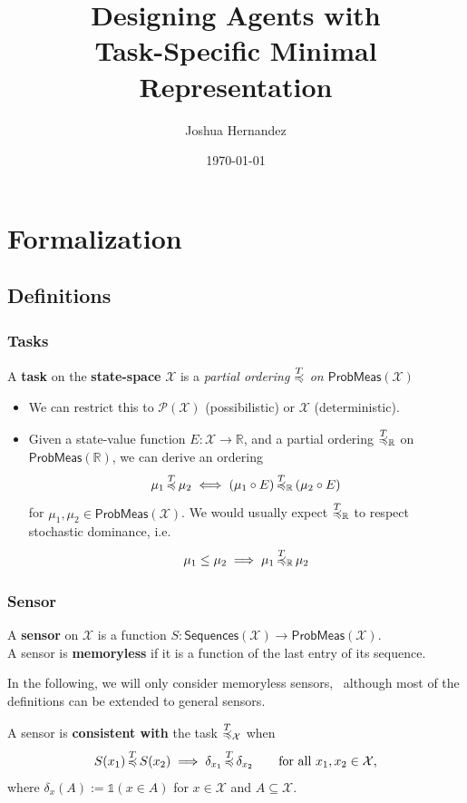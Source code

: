\documentclass{beamer}
\title[Minimal Representation]{Designing Agents with\\ Task-Specific Minimal Representation} %
\author{Joshua Hernandez} %
\institute[UCLA] %
{
University of California, Los Angeles\\ %
\medskip
\textit{jheez@ucla.edu} %
}
\date{\today} %
\def\prob{\mathsf{ProbMeas}}
\def\seq{\mathsf{Sequences}}
\def\X{\mathcal{X}}
\def\RR{\mathbb{R}}
\def\power{\mathcal{P}}
\def\less#1{\overset{#1}{\rule{0pt}{4pt}\smash{\preccurlyeq}}}
\def\subs{\subseteq}
\begin{document}
\begin{frame}
\titlepage %
\end{frame}


\iffalse
\section{Formalization} %

\subsection{Definitions} %


\begin{frame}
\frametitle{Tasks}
\begin{definition}[Task]
A \textbf{task} on the \textbf{state-space} $\X$ is a \emph{partial ordering $\less{T}$ on $\prob(\X)$}
\end{definition}

\begin{itemize}
 \item We can restrict this to $\power(\X)$ (possibilistic) or $\X$ (deterministic).
 \item Given a state-value function $E:\X\to\RR$, and a partial ordering 
 $\less{T}_\RR$ on $\prob(\RR)$, we can derive an ordering
 $$\mu_1\,\less{T}\, \mu_2 \iff (\mu_1\circ E)\,\less{T}_\RR\,(\mu_2\circ E) $$
 for $\mu_1, \mu_2\in\prob(\X)$.  
 We would usually expect $\less{T}_\RR$ to respect stochastic dominance, i.e.
 $$\mu_1\leq\mu_2\implies\mu_1\,\less{T}_\RR\,\mu_2$$
\end{itemize}
\end{frame}




\begin{frame}
\frametitle{Sensor}
\begin{definition}[Sensor]
A \textbf{sensor} on $\X$ is a function $S:\seq(\X)\to\prob(\X)$.\\
A sensor is \textbf{memoryless} if it is a function of the last entry of its sequence.
\end{definition}
In the following, we will only consider memoryless sensors, \
although most of the definitions can be extended to general sensors.
\begin{definition}
A sensor is \textbf{consistent with} the task $\less{T}_\X$ when
$$ S({x_1})\,\less{T}\,S({x_2}) \implies \delta_{x_1}\,\less{T}\,\delta_{x_2}\qquad\text{for all $x_1,x_2\in\X$,}$$
where $\delta_x(A) := \mathds{1}(x\in A)$ for $x\in\X$ and $A\subs\X$.
\end{definition}
\end{frame}
\end{document}
